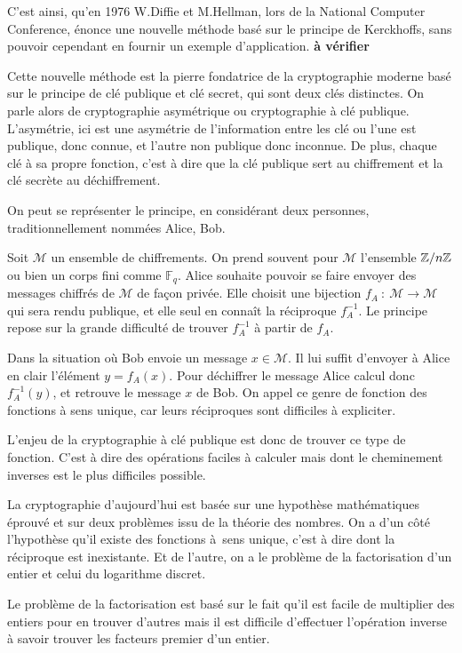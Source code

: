 C'est ainsi, qu'en 1976 W.Diffie et M.Hellman, lors de la National Computer Conference,
énonce une nouvelle méthode basé sur le principe de Kerckhoffs, sans pouvoir
cependant en fournir un exemple d'application.
\textbf{à vérifier}

Cette nouvelle méthode est la pierre fondatrice de la cryptographie moderne basé sur le
principe de clé publique et clé secret, qui sont deux clés distinctes. On parle alors de cryptographie asymétrique ou
cryptographie à clé publique.
L'asymétrie, ici est une asymétrie de l'information entre les clé ou l'une est publique, donc
connue, et l'autre non publique donc inconnue. De plus, chaque clé à sa propre fonction,
c'est à dire que la clé publique sert au chiffrement et la clé secrète au déchiffrement.

On peut se représenter le principe, en considérant deux personnes, traditionnellement
nommées
Alice, Bob.

Soit $\mathcal{M}$ un ensemble de chiffrements. On prend souvent pour $\mathcal{M}$
l'ensemble $\mathbb{Z} / n \mathbb{Z}$ ou bien un corps fini comme $\mathbb{F}_{q}$. Alice souhaite pouvoir se faire envoyer des
messages chiffrés de $\mathcal{M}$ de façon privée. Elle choisit une bijection $f_{A}\ :\
\mathcal{M}\to \mathcal{M}$ qui sera rendu publique, et elle seul en connaît la réciproque
$f_{A}^{-1}$. Le principe repose sur la grande difficulté de trouver $f_{A}^{-1}$ à partir de
$f_{A}$. 

Dans la situation où Bob envoie un message $x \in \mathcal{M}$. Il lui suffit
d'envoyer à Alice en clair l'élément $y = f_{A}(x)$. Pour déchiffrer le message Alice
calcul donc $f_{A}^{-1}(y)$, et retrouve le message $x$ de Bob. On appel ce genre de
fonction des fonctions à sens unique, car leurs réciproques sont difficiles à expliciter.

L'enjeu de la cryptographie à clé publique est donc de trouver ce type de fonction.
C'est à dire des opérations faciles à calculer mais dont le cheminement inverses est le plus
difficiles possible.

La cryptographie d'aujourd'hui est basée sur une hypothèse mathématiques éprouvé et sur deux
problèmes issu de la théorie des nombres. On a d'un côté l'hypothèse qu'il existe des
fonctions à sens unique, c'est à dire dont la réciproque est inexistante. Et de l'autre, on a
le problème de la factorisation d'un entier et celui du logarithme discret.

Le problème de la factorisation est basé sur le fait qu'il est facile de multiplier des
entiers pour en trouver d'autres mais il est difficile d'effectuer l'opération inverse à
savoir trouver les facteurs premier d'un entier.

